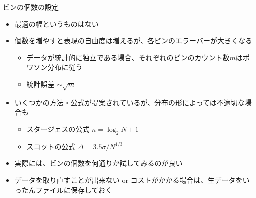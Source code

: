 \begin{frame}[t,fragile]{ビンの個数の設定}
  \begin{itemize}
  \item 最適の幅というものはない
  \item 個数を増やすと表現の自由度は増えるが、各ビンのエラーバーが大きくなる
    \begin{itemize}
    \item データが統計的に独立である場合、それぞれのビンのカウント数$m$はポワソン分布に従う
    \item 統計誤差 $\sim \sqrt{m}$
    \end{itemize}
  \item いくつかの方法・公式が提案されているが、分布の形によっては不適切な場合も
    \begin{itemize}
    \item スタージェスの公式 $n = \log_2 N + 1$
    \item スコットの公式 $\Delta = 3.5 \sigma / N^{1/3}$
    \end{itemize}
  \item 実際には、ビンの個数を何通りか試してみるのが良い
  \item データを取り直すことが出来ない or コストがかかる場合は、生データをいったんファイルに保存しておく
  \end{itemize}
\end{frame}

